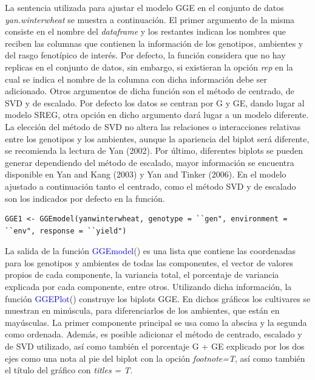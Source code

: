La sentencia utilizada para ajustar el modelo GGE en el conjunto de datos \emph{yan.winterwheat} se muestra a continuación. El primer argumento de la misma consiste en el nombre del \emph{dataframe} y los restantes indican los nombres que reciben las columnas que contienen la información de los genotipos, ambientes y del rasgo fenotípico de interés. Por defecto, la función considera que no hay replicas en el conjunto de datos, sin embargo, si existieran la opción \emph{rep} en la cual se indica el nombre de la columna con dicha información debe ser adicionado. Otros argumentos de dicha función son el método de centrado, de SVD y de escalado. Por defecto los datos se centran por G y GE, dando lugar al modelo SREG, otra opción en dicho argumento dará lugar a un modelo diferente. La elección del método de SVD no altera las relaciones o interacciones relativas entre los genotipos y los ambientes, aunque la apariencia del biplot será diferente, se recomienda la lectura de Yan (2002). Por último, diferentes biplots se pueden generar dependiendo del método de escalado, mayor información se encuentra disponible en Yan and Kang (2003) y Yan and Tinker (2006). En el modelo ajustado a continuación tanto el centrado, como el método SVD y de escalado son los indicados por defecto en la función.

\begin{tcolorbox}[colframe=aurometalsaurus,colback=backcolour,colbacklower=white,
   				width=1\linewidth,
    			height=0.1\linewidth,
    			boxsep=-3mm]
\begin{lstlisting}
GGE1 <- GGEmodel(yanwinterwheat, genotype = ``gen", environment = ``env", response = ``yield")
\end{lstlisting}
\end{tcolorbox}

La salida de la función \textcolor{blue}{GGEmodel}() es una lista que contiene las coordenadas para los genotipos y ambientes de todas las componentes, el vector de valores propios de cada componente, la variancia total, el porcentaje de variancia explicada por cada componente, entre otros. Utilizando dicha información, la función \textcolor{blue}{GGEPlot}() construye los biplots GGE. En dichos gráficos los cultivares se muestran en minúscula, para diferenciarlos de los ambientes, que están en mayúsculas. La primer componente principal se usa como la abscisa y la segunda como ordenada. Además, es posible adicionar el método de centrado, escalado y de SVD utilizado, así como también el porcentaje G + GE explicado por los dos ejes como una nota al pie del biplot con la opción \emph{footnote=T}, así como también el título del gráfico con \emph{titles = T}.



